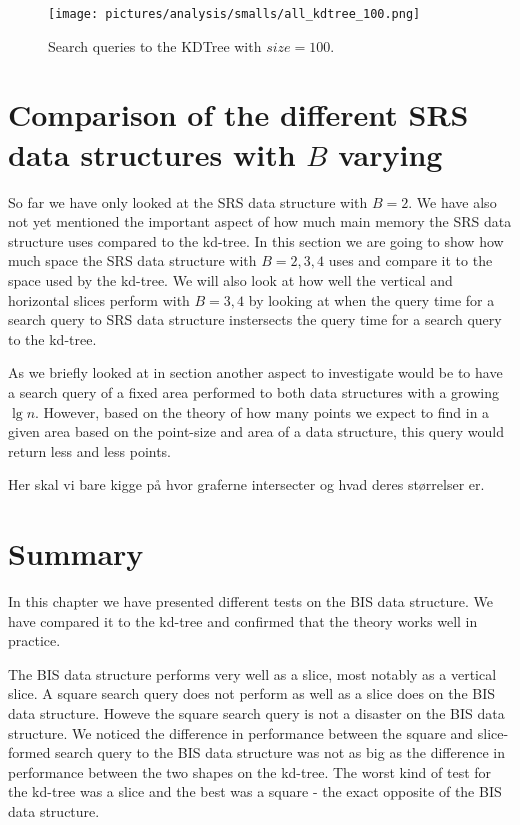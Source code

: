 \begin{figure}[h]
    \centering
    \texttt{[image: pictures/analysis/smalls/all\_kdtree\_100.png]}
    \caption{Search queries to the KDTree with $size=100$.}\label{fig:all_kdtree_100}
\end{figure}

\section{Comparison of the different SRS data structures with $B$ varying}

So far we have only looked at the SRS data structure with $B=2$. We have also not yet mentioned the important aspect of how much main memory the SRS data structure uses compared to the kd-tree. In this section we are going to show how much space the SRS data structure with $B={2,3,4}$ uses and compare it to the space used by the kd-tree. We will also look at how well the vertical and horizontal slices perform with $B={3,4}$ by looking at when the query time for a search query to SRS data structure instersects the query time for a search query to the kd-tree. 


As we briefly looked at in section another aspect to investigate would be to have a search query of a fixed area performed to both data structures with a growing $\lg n$. However, based on the theory of how many points we expect to find in a given area based on the point-size and area of a data structure, this query would return less and less points. 

Her skal vi bare kigge på hvor graferne intersecter og hvad deres størrelser er.

\section{Summary}

In this chapter we have presented different tests on the BIS data structure. We have compared it to the kd-tree and confirmed that the theory works well in practice.

The BIS data structure performs very well as a slice, most notably as a vertical slice. A square search query does not perform as well as a slice does on the BIS data structure. Howeve the square search query is not a disaster on the BIS data structure. We noticed the difference in performance between the square and slice-formed search query to the BIS data structure was not as big as the difference in performance between the two shapes on the kd-tree. The worst kind of test for the kd-tree was a slice and the best was a square - the exact opposite of the BIS data structure.


